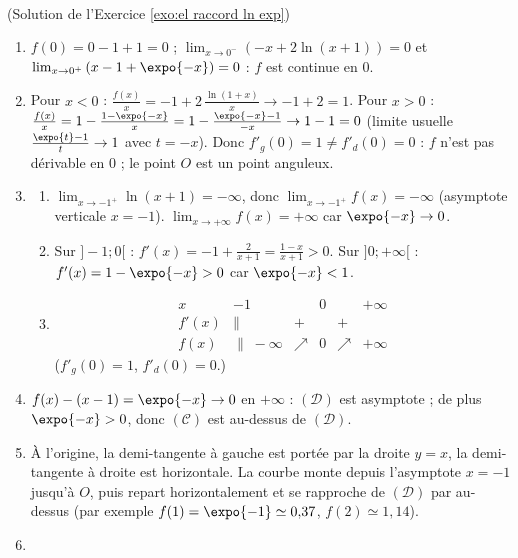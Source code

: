 \begin{corrige}
\begin{sol} ~ \\
(Solution de l'Exercice \ref{exo:el raccord ln exp})
\begin{enumerate}
\item $f(0) = 0 - 1 + 1 = 0$ ; $\lim_{x\to0^-}\left(-x + 2\ln(x+1)\right) = 0$ et $\lim_{x\to0^+}\left(x - 1 + \expo{-x}\right) = 0$ : $f$ est continue en $0$.
\item Pour $x < 0$ : $\frac{f(x)}{x} = -1 + 2\,\frac{\ln(1+x)}{x} \to -1 + 2 = 1$.
      Pour $x > 0$ : $\frac{f(x)}{x} = 1 - \frac{1 - \expo{-x}}{x} = 1 - \frac{\expo{-x} - 1}{-x} \to 1 - 1 = 0$
      (limite usuelle $\frac{\expo{t}-1}{t} \to 1$ avec $t = -x$).
      Donc $f'_g(0) = 1 \neq f'_d(0) = 0$ : $f$ n'est pas d\'erivable en $0$ ; le point $O$ est un point anguleux.
\item \begin{enumerate}
      \item $\lim_{x\to-1^+} \ln(x+1) = -\infty$, donc $\lim_{x\to-1^+} f(x) = -\infty$ (asymptote verticale $x = -1$).
            $\lim_{x\to+\infty} f(x) = +\infty$ car $\expo{-x} \to 0$.
      \item Sur $]-1;0[$ : $f'(x) = -1 + \frac{2}{x+1} = \frac{1-x}{x+1} > 0$.
            Sur $]0;+\infty[$ : $f'(x) = 1 - \expo{-x} > 0$ car $\expo{-x} < 1$.
      \item \[
            \begin{array}{c|ccccc}
            x & -1 & & 0 & & +\infty \\ \hline
            f'(x) & \| & + & & + & \\ \hline
            f(x) & \| \; -\infty & \nearrow & 0 & \nearrow & +\infty
            \end{array}
            \]
            ($f'_g(0) = 1$, $f'_d(0) = 0$.)
      \end{enumerate}
\item $f(x) - (x - 1) = \expo{-x} \to 0$ en $+\infty$ : $(\mathcal{D})$ est asymptote ; de plus $\expo{-x} > 0$, donc $(\mathscr{C})$ est au-dessus de $(\mathcal{D})$.
\item \`A l'origine, la demi-tangente \`a gauche est port\'ee par la droite $y = x$, la demi-tangente \`a droite est horizontale.
      La courbe monte depuis l'asymptote $x = -1$ jusqu'\`a $O$, puis repart horizontalement et se rapproche de $(\mathcal{D})$ par au-dessus
      (par exemple $f(1) = \expo{-1} \simeq 0{,}37$, $f(2) \simeq 1{,}14$).
\item \begin{enumerate}

\end{enumerate}
\end{enumerate}
\end{sol}
\end{corrige}
